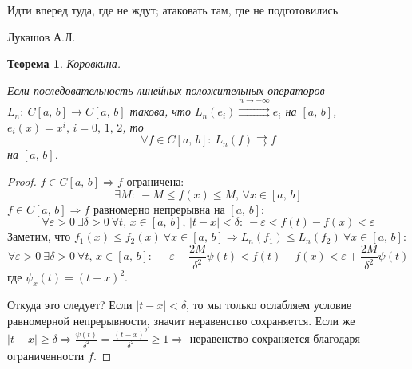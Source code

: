 \documentclass[a4paper,12pt]{article}
\renewcommand{\leq}{\ensuremath{\leqslant}}
\renewcommand{\geq}{\ensuremath{\geqslant}}
\theoremstyle{plain}
\newtheorem{theorem}{Теорема}[section]
\theoremstyle{definition}
\theoremstyle{remark}
\begin{document}
\epigraph{Идти вперед туда, где не ждут; атаковать там, где не подготовились}{Лукашов А.Л.}

\begin{theorem}
	Коровкина.

	Если последовательность линейных положительных операторов $L_n:\: C[a,\,b] \to C[a,\,b]$ такова, что $L_n(e_i) \stackrel{n \to +\infty}{\rightrightarrows} e_i$ на $[a,\,b]$, $e_i(x) = x^i,\, i = 0,\,1,\,2$, то
	\[\forall f \in C[a,\,b]:\: L_n(f) \rightrightarrows f\]
	на $[a,\,b]$.
\end{theorem}
\begin{proof}
	$f \in C[a,\,b] \Rightarrow f$ ограничена:
	\[\exists M:\: -M \leq f(x) \leq M,\, \forall x \in [a,\,b]\]
	$f \in C[a,\,b] \Rightarrow f$ равномерно непрерывна на $[a,\,b]$:
	\[\forall \varepsilon > 0 \: \exists \delta > 0 \: \forall t,\, x \in [a,\,b],\, |t - x| < \delta:\: -\varepsilon < f(t) - f(x) < \varepsilon\]
	Заметим, что $f_1(x) \leq f_2(x) \: \forall x \in [a,\,b] \Rightarrow L_n(f_1) \leq L_n(f_2) \: \forall x \in [a,\,b]$:
	\[\forall \varepsilon > 0 \: \exists \delta > 0 \: \forall t,\,x \in [a,\,b]:\: -\varepsilon - \frac{2M}{\delta^2}\psi(t) < f(t) - f(x) < \varepsilon + \frac{2M}{\delta^2}\psi(t)\]
	где $\psi_x(t) = (t - x)^2$.

	Откуда это следует? Если $|t - x| < \delta$, то мы только ослабляем условие равномерной непрерывности, значит неравенство сохраняется. Если же $|t - x| \geq \delta \Rightarrow \frac{\psi(t)}{\delta^2} = \frac{(t - x)^2}{\delta^2} \geq 1 \Rightarrow$ неравенство сохраняется благодаря ограниченности $f$.


\end{proof}
\end{document}
